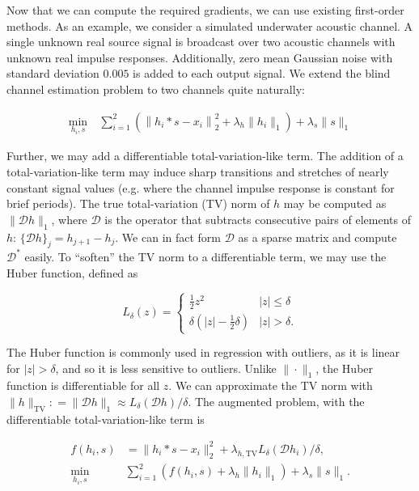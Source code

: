 \documentclass[journal]{IEEEtran}
\newcommand{\defeq}{\mathrel{\mathop:}=}
\begin{document}
Now that we can compute the required gradients, we can use existing first-order methods.  As an example, we consider a simulated underwater acoustic channel.  A single unknown real source signal is broadcast over two acoustic channels with unknown real impulse responses.  Additionally, zero mean Gaussian noise with standard deviation $0.005$ is added to each output signal.  We extend the blind channel estimation problem to two channels quite naturally:

\begin{align*}
   \min_{h_i,s} ~&\sum_{i=1}^2\left(\left\|h_i\ast s - x_i\right\|_2^2 + \lambda_{h}\|h_i\|_1\right) + \lambda_s\|s\|_1
\end{align*}

\noindent Further, we may add a differentiable total-variation-like term.  The addition of a total-variation-like term may induce sharp transitions and stretches of nearly constant signal values (e.g. where the channel impulse response is constant for brief periods).  The true total-variation (TV) norm of $h$ may be computed as $\|\mathcal{D}h\|_1$, where $\mathcal{D}$ is the operator that subtracts consecutive pairs of elements of $h$: $\{\mathcal{D}h\}_j = h_{j+1} - h_j$.  We can in fact form $\mathcal{D}$ as a sparse matrix and compute $\mathcal{D}^\ast$ easily.  To ``soften'' the TV norm to a differentiable term, we may use the Huber function, defined as

\[ L_\delta(z) = \left\{\begin{array}{ll} \frac{1}{2}z^2 & |z| \le \delta\\ \delta\left(|z| - \frac{1}{2}\delta\right) & |z| > \delta. \end{array}\right. \] 

\noindent The Huber function is commonly used in regression with outliers, as it is linear for $|z|>\delta$, and so it is less sensitive to outliers.  Unlike $\|\cdot\|_1$, the Huber function is differentiable for all $z$.  We can approximate the TV norm with ${\|h\|_\text{TV} \defeq\|\mathcal{D}h\|_1 \approx L_\delta(\mathcal{D}h)/\delta}$.  The augmented problem, with the differentiable total-variation-like term is

\begin{align}
   \label{eq:bce_aug}
   f(h_i,s) &= \|h_i\ast s - x_i\|_2^2 + \lambda_{h,\text{TV}}L_\delta(\mathcal{D}h_i)/\delta,\nonumber\\
   \min_{h_i,s} ~&\sum_{i=1}^2\left(f(h_i,s) + \lambda_h\|h_i\|_1\right) + \lambda_s\|s\|_1.
\end{align}
\end{document}

